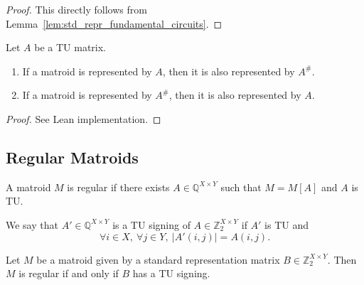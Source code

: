 \begin{proof}
    This directly follows from Lemma~\ref{lem:std_repr_fundamental_circuits}.
\end{proof}

\begin{lemma}\label{lem:repr_TU_iff_repr_TU_support}
    Let $A$ be a TU matrix.
    \begin{enumerate}
        \item If a matroid is represented by $A$, then it is also represented by $A^{\#}$.
        \item If a matroid is represented by $A^{\#}$, then it is also represented by $A$.
    \end{enumerate}
\end{lemma}

\begin{proof}
    See Lean implementation.
\end{proof}


\subsection{Regular Matroids}

\begin{definition}\label{def:regular}
    A matroid $M$ is regular if there exists $A \in \mathbb{Q}^{X \times Y}$ such that $M = M[A]$ and $A$ is TU.
\end{definition}

\begin{definition}\label{def:tu_signing}
    We say that $A' \in \mathbb{Q}^{X \times Y}$ is a TU signing of $A \in \mathbb{Z}_{2}^{X \times Y}$ if $A'$ is TU and
    \[
        \forall i \in X, \ \forall j \in Y, \ |A' (i, j)| = A (i, j).
    \]
\end{definition}

\begin{lemma}\label{lem:regular_defs_equiv}
    Let $M$ be a matroid given by a standard representation matrix $B \in \mathbb{Z}_{2}^{X \times Y}$. Then $M$ is regular if and only if $B$ has a TU signing.
\end{lemma}

